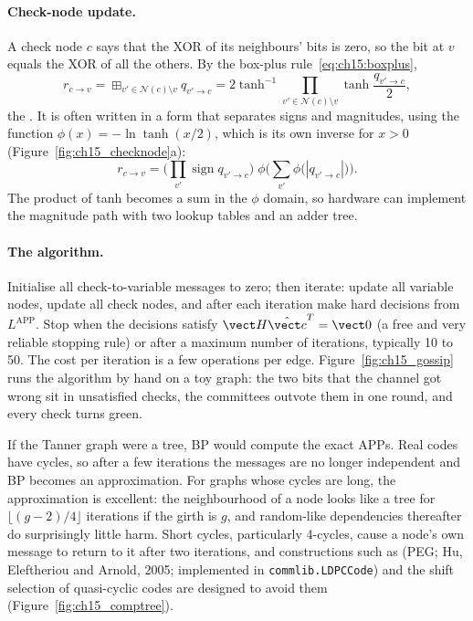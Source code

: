 \paragraph{Check-node update.} A check node $c$ says that the XOR of its neighbours' bits is zero,
so the bit at $v$ equals the XOR of all the others. By the box-plus rule~\eqref{eq:ch15:boxplus},
\begin{equation}
r_{c\to v}=\mathop{\boxplus}_{v'\in\mathcal N(c)\setminus v}q_{v'\to c}
=2\tanh^{-1}\!\prod_{v'\in\mathcal N(c)\setminus v}\tanh\frac{q_{v'\to c}}{2},
\label{eq:ch15:tanh}
\end{equation}
the . It is often written in a form that separates signs and magnitudes, using the
function $\phi(x)=-\ln\tanh(x/2)$, which is its own inverse for $x>0$
(Figure~\ref{fig:ch15_checknode}a):
\begin{equation}
r_{c\to v}=\Big(\prod_{v'}\operatorname{sign}q_{v'\to c}\Big)\;
\phi\Big(\sum_{v'}\phi\big(|q_{v'\to c}|\big)\Big).
\label{eq:ch15:phi}
\end{equation}
The product of tanh becomes a sum in the $\phi$ domain, so hardware can implement the magnitude path
with two lookup tables and an adder tree.


\paragraph{The algorithm.} Initialise all check-to-variable messages to zero; then iterate: update
all variable nodes, update all check nodes, and after each iteration make hard decisions from
$L^{\text{APP}}$. Stop when the decisions satisfy $\vect H\hat{\vect c}^T=\vect 0$ (a free and very
reliable stopping rule) or after a maximum number of iterations, typically 10 to 50. The cost per
iteration is a few operations per edge. Figure~\ref{fig:ch15_gossip} runs the algorithm by hand on
a toy graph: the two bits that the channel got wrong sit in unsatisfied checks, the committees
outvote them in one round, and every check turns green.

If the Tanner graph were a tree, BP would compute the exact APPs. Real codes have cycles, so after
a few iterations the messages are no longer independent and BP becomes an approximation. For graphs
whose cycles are long, the approximation is excellent: the neighbourhood of a node looks like a tree
for $\lfloor(g-2)/4\rfloor$ iterations if the girth is $g$, and random-like dependencies thereafter
do surprisingly little harm. Short cycles, particularly 4-cycles, cause a node's own message to
return to it after two iterations, and constructions such as 
(PEG; Hu, Eleftheriou and Arnold, 2005; implemented in \texttt{commlib.LDPCCode}) and the shift
selection of quasi-cyclic codes are designed to avoid them (Figure~\ref{fig:ch15_comptree}).

